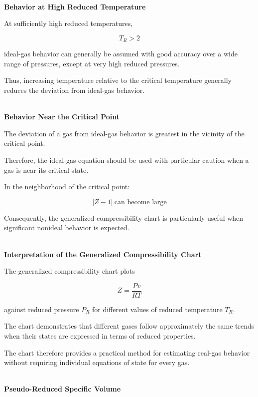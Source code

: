 \documentclass[12pt]{article}
\begin{document}
\textbf{\\ Behavior at High Reduced Temperature}

At sufficiently high reduced temperatures,

\begin{equation*}
\boxed{T_R>2}
\end{equation*}

ideal-gas behavior can generally be assumed with good accuracy over a wide range of pressures, except at very high reduced pressures.

Thus, increasing temperature relative to the critical temperature generally reduces the deviation from ideal-gas behavior.

\textbf{\\ Behavior Near the Critical Point}

The deviation of a gas from ideal-gas behavior is greatest in the vicinity of the critical point.

Therefore, the ideal-gas equation should be used with particular caution when a gas is near its critical state.

In the neighborhood of the critical point:

\begin{equation*}
\boxed{|Z-1|\ \text{can become large}}
\end{equation*}

Consequently, the generalized compressibility chart is particularly useful when significant nonideal behavior is expected.

\textbf{\\ Interpretation of the Generalized Compressibility Chart}

The generalized compressibility chart plots

\begin{equation*}
Z=\frac{Pv}{RT}
\end{equation*}

against reduced pressure $P_R$ for different values of reduced temperature $T_R$.

The chart demonstrates that different gases follow approximately the same trends when their states are expressed in terms of reduced properties.

The chart therefore provides a practical method for estimating real-gas behavior without requiring individual equations of state for every gas.

\textbf{\\ Pseudo-Reduced Specific Volume}
\end{document}
